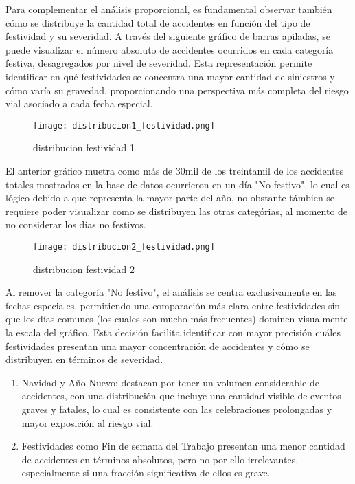 \documentclass{book}
\begin{document}
Para complementar el análisis proporcional, es fundamental observar también cómo se distribuye la cantidad total de accidentes en función del tipo de festividad y su severidad. A través del siguiente gráfico de barras apiladas, se puede visualizar el número absoluto de accidentes ocurridos en cada categoría festiva, desagregados por nivel de severidad. Esta representación permite identificar en qué festividades se concentra una mayor cantidad de siniestros y cómo varía su gravedad, proporcionando una perspectiva más completa del riesgo vial asociado a cada fecha especial.

\begin{figure}[htbp]
\centering
\texttt{[image: distribucion1\_festividad.png]}
\caption{\label{fig:distribucion festividad 1}distribucion festividad 1}
\end{figure}

El anterior gráfico muetra como más de 30mil de los treintamil de los accidentes totales mostrados en la base de datos ocurrieron en un día "No festivo", lo cual es lógico debido a que representa la mayor parte del año, no obstante támbien se requiere poder visualizar como se distribuyen las otras categórias, al momento de no considerar los días no festivos.

\begin{figure}[htbp]
\centering
\texttt{[image: distribucion2\_festividad.png]}
\caption{\label{fig:distribucion festividad 2}distribucion festividad 2}
\end{figure}

Al remover la categoría "No festivo", el análisis se centra exclusivamente en las fechas especiales, permitiendo una comparación más clara entre festividades sin que los días comunes (los cuales son mucho más frecuentes) dominen visualmente la escala del gráfico. Esta decisión facilita identificar con mayor precisión cuáles festividades presentan una mayor concentración de accidentes y cómo se distribuyen en términos de severidad.

\begin{enumerate}

\item Navidad y Año Nuevo: destacan por tener un volumen considerable de accidentes, con una distribución que incluye una cantidad visible de eventos graves y fatales, lo cual es consistente con las celebraciones prolongadas y mayor exposición al riesgo vial.

\item Festividades como Fin de semana del Trabajo presentan una menor cantidad de accidentes en términos absolutos, pero no por ello irrelevantes, especialmente si una fracción significativa de ellos es grave.

\end{enumerate}
\end{document}
